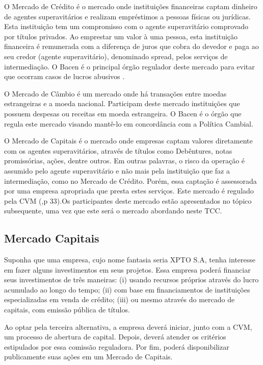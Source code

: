 O Mercado de Crédito é o mercado onde instituições financeiras captam dinheiro de agentes superavitários e realizam empréstimos a pessoas físicas ou jurídicas. Esta instituição tem um compromisso com o agente superavitário comprovado por títulos privados. Ao emprestar um valor à uma pessoa, esta instituição financeira é remunerada com a diferença de juros que cobra do devedor e paga ao seu credor (agente superavitário), denominado spread, pelos serviços de intermediação. O Bacen é o principal órgão regulador deste mercado para evitar que ocorram casos de lucros abusivos \cite[p. 32]{cmv2014}.

O Mercado de Câmbio é um mercado onde há transações entre moedas estrangeiras e a moeda nacional. Participam deste mercado instituições que possuem despesas ou receitas em moeda estrangeira. O Bacen é o órgão que regula este mercado visando mantê-lo em concordância com a Política Cambial\cite[p. 32]{cmv2014}.

O Mercado de Capitais é o mercado onde empresas captam valores diretamente com os agentes superavitários, através de títulos como Debêntures, notas promissórias, ações, dentre outros. Em outras palavras, o risco da operação é assumido pelo agente superavitário e não mais pela instituição que faz a intermediação, como no Mercado de Crédito. Porém, essa captação é assessorada por uma empresa apropriada que presta estes serviços. Este mercado é regulado pela CVM (\citeyear{cmv2014},p 33).Os participantes deste mercado estão apresentados no tópico subsequente, uma vez que este será o mercado abordando neste TCC.

\subsection{Mercado Capitais}

Suponha que uma empresa, cujo nome fantasia seria XPTO S.A, tenha interesse em fazer alguns investimentos em seus projetos. Essa empresa poderá financiar seus investimentos de três maneiras: (i) usando recursos próprios através do lucro acumulado ao longo do tempo; (ii) com base em financiamentos de instituições especializadas em venda de crédito; (iii) ou mesmo através do mercado de capitais, com emissão pública de títulos.
	
Ao optar pela terceira alternativa, a empresa deverá iniciar, junto com a CVM, um processo de abertura de capital. Depois, deverá atender os critérios estipulados por essa comissão reguladora. Por fim, poderá disponibilizar publicamente suas ações  em um Mercado de Capitais. 

